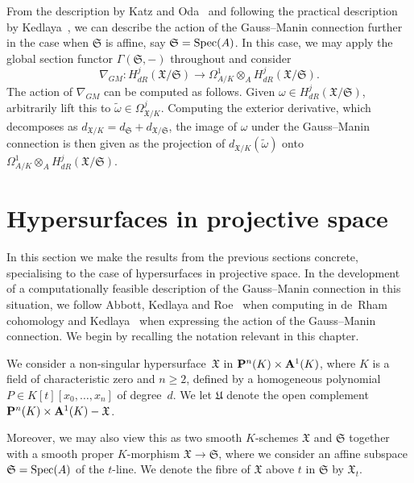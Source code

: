 \begin{rem}
From the description by Katz and Oda~\citep{KatzOda1968} and following the 
practical description by Kedlaya~\citep{Kedlaya2008}, we can describe the 
action of the Gauss--Manin connection further in the case when $\mathfrak{S}$ 
is affine, say $\mathfrak{S} = \operatorname{Spec}(A)$.  In this case, we may apply the 
global section functor $\Gamma(\mathfrak{S}, -)$ throughout and consider
\begin{equation*}
\nabla_{GM} \colon H_{dR}^j(\mathfrak{X}/\mathfrak{S}) \to 
    \Omega_{A/K}^1 \otimes_{A} H_{dR}^j(\mathfrak{X}/\mathfrak{S}).
\end{equation*}
The action of $\nabla_{GM}$ can be computed as follows.  Given 
$\omega \in H_{dR}^j(\mathfrak{X}/\mathfrak{S})$, arbitrarily lift this to 
$\tilde{\omega} \in \Omega_{\mathfrak{X}/K}^j$.  Computing the 
exterior derivative, which decomposes as 
$d_{\mathfrak{X}/K} = d_{\mathfrak{S}} + d_{\mathfrak{X}/\mathfrak{S}}$, 
the image of $\omega$ under the Gauss--Manin connection is then given as 
the projection of $d_{\mathfrak{X}/K}(\tilde{\omega})$ onto 
$\Omega_{A/K}^1 \otimes_{A} H_{dR}^j(\mathfrak{X}/\mathfrak{S})$.
\end{rem}


\section{Hypersurfaces in projective space}
\label{sec:01-05-hypersurfaces}

In this section we make the results from the previous sections concrete, 
specialising to the case of hypersurfaces in projective space.  In the 
development of a computationally feasible description of the Gauss--Manin 
connection in this situation, we follow Abbott, Kedlaya and 
Roe~\citep[\S 3.2]{AbbottKedlayaRoe2006} when computing in 
de~Rham cohomology and Kedlaya~\citep[\S 3.2]{Kedlaya2008} when 
expressing the action of the Gauss--Manin connection.  We begin by recalling 
the notation relevant in this chapter.

\begin{notation} \label{not:01-05-main}
We consider a non-singular hypersurface~$\mathfrak{X}$ in 
$\mathbf{P}^n(K) \times \mathbf{A}^1(K)$, where $K$ is a field of characteristic 
zero and $n \geq 2$, defined by a homogeneous polynomial 
$P \in K[t][x_0, \dotsc, x_n]$ of degree~$d$.  We let $\mathfrak{U}$ denote 
the open complement $\mathbf{P}^n(K) \times \mathbf{A}^1(K) - \mathfrak{X}$.

Moreover, we may also view this as two smooth $K$-schemes 
$\mathfrak{X}$ and $\mathfrak{S}$ together with a smooth proper 
$K$-morphism $\mathfrak{X} \to \mathfrak{S}$, where we consider 
an affine subspace $\mathfrak{S} = \operatorname{Spec}(A)$ of the $t$-line.  
We denote the fibre of $\mathfrak{X}$ above $t$ in $\mathfrak{S}$ 
by $\mathfrak{X}_t$.
\end{notation}

